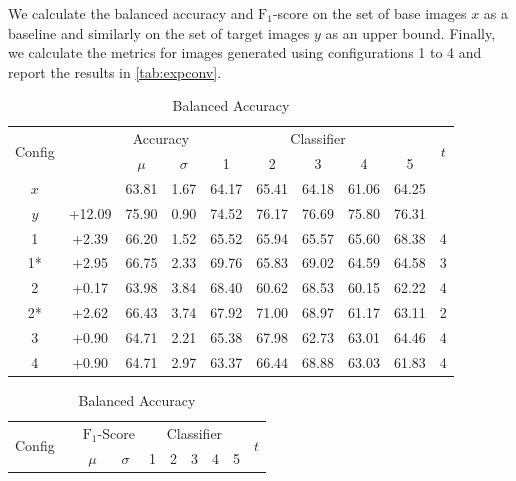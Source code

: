 We calculate the balanced accuracy and $\text{F}_1$-score on the set of base images $x$ as a baseline and similarly on the set of target images $y$ as an upper bound. Finally, we calculate the metrics for images generated using configurations 1 to 4 and report the results in \autoref{tab:expconv}.

\begin{table}[h]
	\begin{center}
		\begin{tabular}{c c c c c c c c c c}
			\toprule
			\multirow{2}{*}{Config} &
			 &
			\multicolumn{2}{c}{Accuracy} &
			\multicolumn{5}{c}{Classifier} &
			\multirow{2}{*}{$t$} \\
			\cmidrule(lr){3-4}
			\cmidrule(lr){5-9}
			 & & $\mu$ & $\sigma$ & 1 & 2 & 3 & 4 & 5 \\
			\cmidrule(lr){1-10}
			$x$\hphantom{*} &        & 63.81 & 1.67 & 64.17 & 65.41 & 64.18 & 61.06 & 64.25 &   \\
			$y$\hphantom{*} & +12.09 & 75.90 & 0.90 & 74.52 & 76.17 & 76.69 & 75.80 & 76.31 &   \\
			\cmidrule(lr){1-10}
			1\hphantom{*}   & +2.39  & 66.20 & 1.52 & 65.52 & 65.94 & 65.57 & 65.60 & 68.38 & 4 \\
			1*              & +2.95  & 66.75 & 2.33 & 69.76 & 65.83 & 69.02 & 64.59 & 64.58 & 3 \\
			2\hphantom{*}   & +0.17  & 63.98 & 3.84 & 68.40 & 60.62 & 68.53 & 60.15 & 62.22 & 4 \\
			2*              & +2.62  & 66.43 & 3.74 & 67.92 & 71.00 & 68.97 & 61.17 & 63.11 & 2 \\
			3\hphantom{*}   & +0.90  & 64.71 & 2.21 & 65.38 & 67.98 & 62.73 & 63.01 & 64.46 & 4 \\
			4\hphantom{*}   & +0.90  & 64.71 & 2.97 & 63.37 & 66.44 & 68.88 & 63.03 & 61.83 & 4 \\
			\bottomrule
		\end{tabular}
		\caption*{Balanced Accuracy}
	\end{center}
	\begin{center}
		\begin{tabular}{c c c c c c c c c c}
			\toprule
			\multirow{2}{*}{Config} &
			 &
			\multicolumn{2}{c}{$\text{F}_1$-Score} &
			\multicolumn{5}{c}{Classifier} &
			\multirow{2}{*}{$t$} \\
			\cmidrule(lr){3-4}
			\cmidrule(lr){5-9}
			 & & $\mu$ & $\sigma$ & 1 & 2 & 3 & 4 & 5 \\

\end{tabular}
\end{center}
\end{table}
